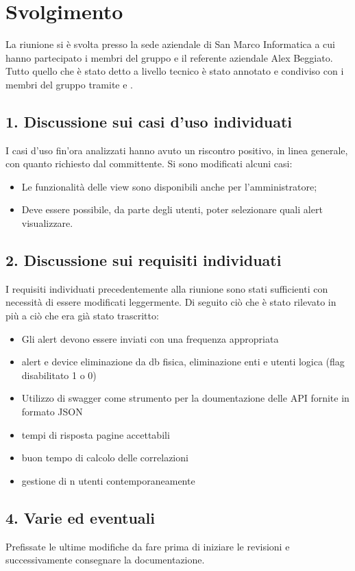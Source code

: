 \newpage
\section*{Svolgimento}

	La riunione si è svolta presso la sede aziendale di San Marco Informatica a cui hanno partecipato i membri del gruppo e il referente aziendale Alex Beggiato. Tutto quello che è stato detto a livello tecnico è stato annotato e condiviso con i membri del gruppo tramite  e .

	\subsection*{1. Discussione sui casi d'uso individuati}

	I casi d'uso fin'ora analizzati hanno avuto un riscontro positivo, in linea generale, con quanto richiesto dal committente. Si sono modificati alcuni casi:
	\begin{itemize}
		\item Le funzionalità delle view sono disponibili anche per l'amministratore;
		\item Deve essere possibile, da parte degli utenti, poter selezionare quali alert visualizzare.
	\end{itemize}

	\subsection*{2. Discussione sui requisiti individuati}

	I requisiti individuati precedentemente alla riunione sono stati sufficienti con necessità di essere modificati leggermente. Di seguito ciò che è stato rilevato in più a ciò che era già stato trascritto:
	\begin{itemize}
		\item Gli alert devono essere inviati con una frequenza appropriata
		\item alert e device eliminazione da db fisica, eliminazione enti e utenti logica (flag disabilitato 1 o 0)
		\item Utilizzo di swagger come strumento per la doumentazione delle API fornite in formato JSON
		\item tempi di risposta pagine accettabili
		\item buon tempo di calcolo delle correlazioni
		\item gestione di n utenti contemporaneamente
	\end{itemize}
	
	\subsection*{4. Varie ed eventuali}
	
	Prefissate le ultime modifiche da fare prima di iniziare le revisioni e successivamente consegnare la documentazione.

	